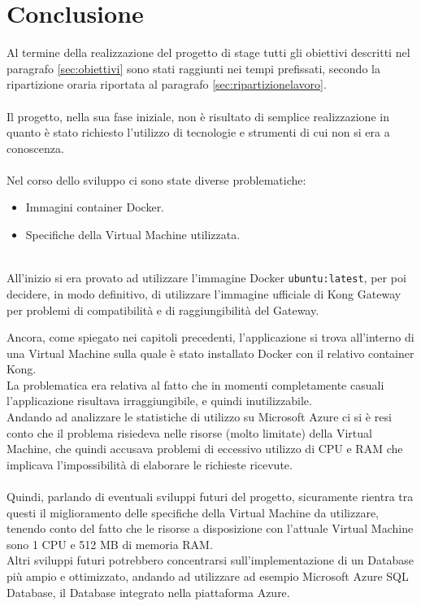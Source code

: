\chapter*{Conclusione} %
Al termine della realizzazione del progetto di stage tutti gli obiettivi descritti nel paragrafo \ref{sec:obiettivi} sono stati raggiunti nei tempi prefissati, 
secondo la ripartizione oraria riportata al paragrafo \ref{sec:ripartizionelavoro}.\\ \\

Il progetto, nella sua fase iniziale, non è risultato di semplice realizzazione in quanto è stato richiesto l'utilizzo di tecnologie e strumenti di cui non si era a conoscenza.\\ \\

Nel corso dello sviluppo ci sono state diverse problematiche:
\begin{itemize}
\item Immagini container Docker.
\item Specifiche della Virtual Machine utilizzata.
\end{itemize}
\  \\
All'inizio si era provato ad utilizzare l'immagine Docker \texttt{ubuntu:latest}, per poi decidere, in modo definitivo, di utilizzare l'immagine ufficiale di Kong Gateway 
per problemi di compatibilità e di raggiungibilità del Gateway.

Ancora, come spiegato nei capitoli precedenti, l'applicazione si trova all'interno di una Virtual Machine sulla quale è stato installato Docker con il relativo container Kong.\\
La problematica era relativa al fatto che in momenti completamente casuali l'applicazione risultava irraggiungibile, e quindi inutilizzabile.\\ 
Andando ad analizzare le statistiche di utilizzo su Microsoft Azure ci si è resi conto che il problema risiedeva nelle risorse (molto limitate) della Virtual Machine, 
che quindi accusava problemi di eccessivo utilizzo di CPU e RAM che implicava l'impossibilità di elaborare le richieste ricevute.\\ \\ 

Quindi, parlando di eventuali sviluppi futuri del progetto, sicuramente rientra tra questi il miglioramento delle specifiche della Virtual Machine da utilizzare, 
tenendo conto del fatto che le risorse a disposizione con l'attuale Virtual Machine sono 1 CPU e 512 MB di memoria RAM.\\
Altri sviluppi futuri potrebbero concentrarsi sull'implementazione di un Database più ampio e ottimizzato, andando ad utilizzare ad esempio Microsoft Azure SQL Database, 
il Database integrato nella piattaforma Azure.

